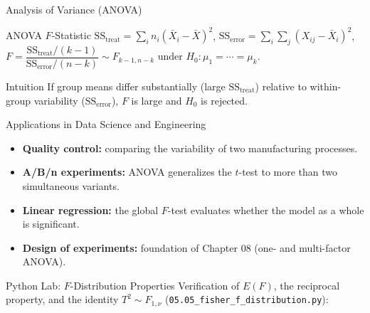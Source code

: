 \documentclass[aspectratio=169,xcolor={dvipsnames,table}]{beamer}
\begin{document}
\begin{frame}{Analysis of Variance (ANOVA)}
	\vspace{-0.15cm}
	\begin{block}{ANOVA $F$-Statistic}
		\footnotesize
		$\text{SS}_{\text{treat}} = \sum_i n_i(\bar X_i-\bar X)^2$, $\text{SS}_{\text{error}} = \sum_i\sum_j(X_{ij}-\bar X_i)^2$, $F = \dfrac{\text{SS}_{\text{treat}}/(k-1)}{\text{SS}_{\text{error}}/(n-k)} \sim F_{k-1,n-k}$ under $H_0:\mu_1=\cdots=\mu_k$.
	\end{block}
	\pause
	\vspace{0.1cm}
	\begin{alertblock}{Intuition}
		If group means differ substantially (large $\text{SS}_{\text{treat}}$) relative to within-group variability ($\text{SS}_{\text{error}}$), $F$ is large and $H_0$ is rejected.
	\end{alertblock}
\end{frame}

\begin{frame}{Applications in Data Science and Engineering}
	\vspace{-0.1cm}
	\begin{itemize}\itemsep=0.1cm
		\item \textbf{Quality control:} comparing the variability of two manufacturing processes. \pause
		\item \textbf{A/B/n experiments:} ANOVA generalizes the $t$-test to more than two simultaneous variants. \pause
		\item \textbf{Linear regression:} the global $F$-test evaluates whether the model as a whole is significant. \pause
		\item \textbf{Design of experiments:} foundation of Chapter 08 (one- and multi-factor ANOVA).
	\end{itemize}
\end{frame}

\begin{frame}[fragile]{Python Lab: $F$-Distribution Properties}
	\vspace{-0.05cm}
	\scriptsize
	Verification of $E(F)$, the reciprocal property, and the identity $T^2\sim F_{1,\nu}$ (\texttt{05.05\_fisher\_f\_distribution.py}):
	{
	}
\end{frame}
\end{document}
